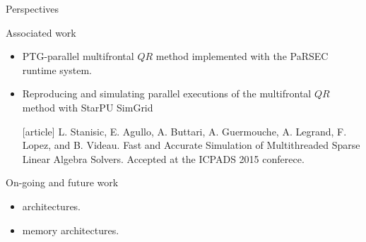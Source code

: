 \begin{frame}{Perspectives}

  \begin{block}{Associated work }
    \begin{itemize}
    \item PTG-parallel multifrontal $QR$ method implemented with the
      PaRSEC runtime system.
    \item Reproducing and simulating parallel executions of the
      multifrontal $QR$ method with StarPU SimGrid
      
      {\scriptsize \begin{thebibliography}{9}
          [article]
         L. Stanisic, E. Agullo, A. Buttari,
          A. Guermouche, A. Legrand, F. Lopez, and B. Videau.
          \newblock Fast and Accurate Simulation of Multithreaded
          Sparse Linear Algebra Solvers. \newblock Accepted at the
          ICPADS 2015 conferece.
      \end{thebibliography}}

    \end{itemize}
  \end{block}

  \begin{exampleblock}{On-going and future work}
    
    \vspace{-0.3cm}
    
    \begin{itemize}
    \item {} architectures.
    \item {} memory architectures.
    \end{itemize}
    
  \end{exampleblock}

\end{frame}

